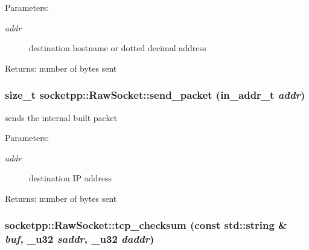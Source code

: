 \begin{Desc}
\item[Parameters:]
\begin{description}
\item[{\em addr}]destination hostname or dotted decimal address \end{description}
\end{Desc}
\begin{Desc}
\item[Returns:]number of bytes sent \end{Desc}
\hypertarget{classsocketpp_1_1RawSocket_5c812c1bf584f40c3fc6263a8014395b}{
\subsubsection[{send\_\-packet}]{\setlength{\rightskip}{0pt plus 5cm}size\_\-t socketpp::RawSocket::send\_\-packet (in\_\-addr\_\-t {\em addr})}}
\label{classsocketpp_1_1RawSocket_5c812c1bf584f40c3fc6263a8014395b}


sends the internal built packet 

\begin{Desc}
\item[Parameters:]
\begin{description}
\item[{\em addr}]destination IP address \end{description}
\end{Desc}
\begin{Desc}
\item[Returns:]number of bytes sent \end{Desc}
\hypertarget{classsocketpp_1_1RawSocket_01e34dbdba36284d5e96896dc083702b}{
\subsubsection[{tcp\_\-checksum}]{ socketpp::RawSocket::tcp\_\-checksum (const std::string \& {\em buf}, \/  {\bf \_\-u32} {\em saddr}, \/  {\bf \_\-u32} {\em daddr})}}
\label{classsocketpp_1_1RawSocket_01e34dbdba36284d5e96896dc083702b}


